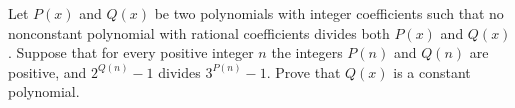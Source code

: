 Let $P(x)$ and $Q(x)$ be two polynomials with integer coefficients such that no nonconstant polynomial with rational coefficients divides both $P(x)$ and $Q(x)$. Suppose that for every positive integer $n$ the integers $P(n)$ and $Q(n)$ are positive, and $2^{Q(n)} - 1$ divides $3^{P(n)} - 1$. Prove that $Q(x)$ is a constant polynomial.
